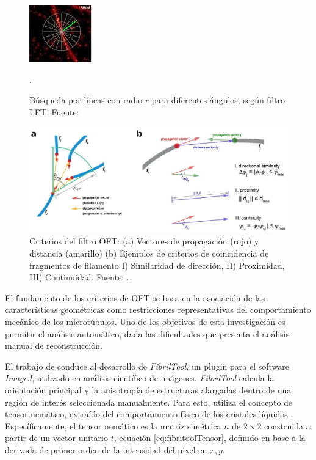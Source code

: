 \begin{figure}[h]
        \centering
        \includegraphics[scale=5]{imagenes/MT-LFT.jpeg}
        \caption[B\'usqueda por l\'ineas con radio $r$ para diferentes \'angulos, según filtro LFT.]{B\'usqueda por l\'ineas con radio $r$ para diferentes \'angulos, según filtro LFT. Fuente: \cite{zhang2017extracting}}.
        \label{fig:MTLFT}
\end{figure}

\begin{figure}[h]
        \centering
        \includegraphics[scale=0.38]{imagenes/MT-OFT.jpeg}
        \caption[Criterios del filtro OFT.]{Criterios del filtro OFT: (a) Vectores de propagaci\'on (rojo) y distancia (amarillo) (b) Ejemplos de criterios de coincidencia de fragmentos de filamento I) Similaridad de direcci\'on, II) Proximidad, III) Continuidad. Fuente: \citet{zhang2017extracting}.}
        \label{fig:MTOFT}
\end{figure}


El fundamento de los criterios de OFT se basa en la asociaci\'on de las caracter\'isticas geom\'etricas como restricciones representativas del comportamiento mec\'anico de los microt\'ubulos. Uno de los objetivos de esta investigaci\'on es permitir el an\'alisis autom\'atico, dada las dificultades que presenta el an\'alisis manual de reconstrucci\'on. %


El trabajo de \citet{boudaoud2014fibriltool} conduce al desarrollo de {\it FibrilTool}, un plugin para el software {\it ImageJ}, utilizado en an\'alisis cient\'ifico de im\'agenes. {\it FibrilTool} calcula la orientaci\'on principal y la anisotrop\'ia de estructuras alargadas dentro de una regi\'on de inter\'es seleccionada manualmente. Para esto, utiliza el concepto de tensor nem\'atico, extra\'ido del comportamiento f\'isico de los cristales l\'iquidos. Espec\'ificamente, el tensor nem\'atico es la matriz sim\'etrica $n$ de $2\times2$ construida a partir de un vector unitario $t$, ecuaci\'on \ref{eq:fibritoolTensor}, definido en base a la derivada de primer orden de la intensidad del pixel en $x,y$. %

